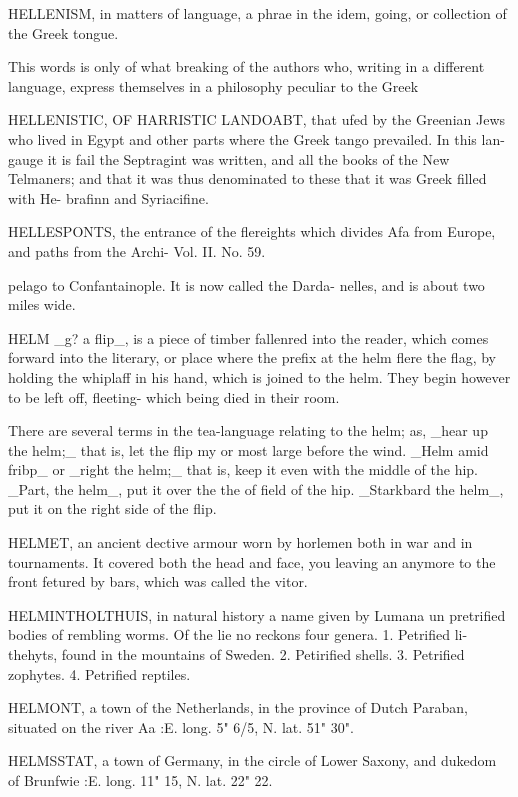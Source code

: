 HELLENISM, in matters of language, a phrae in the idem, going, or collection of the Greek tongue.\par\medskip
This words is only of what breaking of the authors who, writing in a different language, express themselves in a philosophy peculiar to the Greek\par\medskip
HELLENISTIC, OF HARRISTIC LANDOABT, that ufed by the Greenian Jews who lived in Egypt and other parts where the Greek tango prevailed. In this lan- gauge it is fail the Septragint was written, and all the books of the New Telmaners; and that it was thus denominated to these that it was Greek filled with He- brafinn and Syriacifine.\par\medskip
HELLESPONTS, the entrance of the flereights which divides Afa from Europe, and paths from the Archi- Vol. II. No. 59.\par\medskip
pelago to Confantainople. It is now called the Darda- nelles, and is about two miles wide.\par\medskip
HELM \_g? a flip\_, is a piece of timber fallenred into the reader, which comes forward into the literary, or place where the prefix at the helm flere the flag, by holding the whiplaff in his hand, which is joined to the helm. They begin however to be left off, fleeting- which being died in their room.\par\medskip
There are several terms in the tea-language relating to the helm; as, \_hear up the helm;\_ that is, let the flip my or most large before the wind. \_Helm amid fribp\_ or \_right the helm;\_ that is, keep it even with the middle of the hip. \_Part, the helm\_, put it over the the of field of the hip. \_Starkbard the helm\_, put it on the right side of the flip.\par\medskip
HELMET, an ancient dective armour worn by horlemen both in war and in tournaments. It covered both the head and face, you leaving an anymore to the front fetured by bars, which was called the vitor.\par\medskip
HELMINTHOLTHUIS, in natural history a name given by Lumana un pretrified bodies of rembling worms. Of the lie no reckons four genera. 1. Petrified li- thehyts, found in the mountains of Sweden. 2. Petirified shells. 3. Petrified zophytes. 4. Petrified reptiles.\par\medskip
HELMONT, a town of the Netherlands, in the province of Dutch Paraban, situated on the river Aa :E. long. 5" 6/5, N. lat. 51" 30".\par\medskip
HELMSSTAT, a town of Germany, in the circle of Lower Saxony, and dukedom of Brunfwie :E. long. 11" 15, N. lat. 22" 22.\par\medskip

